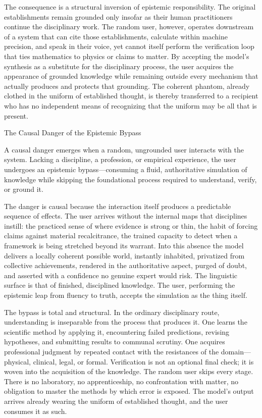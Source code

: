 The consequence is a structural inversion of epistemic responsibility. The original establishments remain grounded only insofar as their human practitioners continue the disciplinary work. The random user, however, operates downstream of a system that can cite those establishments, calculate within machine precision, and speak in their voice, yet cannot itself perform the verification loop that ties mathematics to physics or claims to matter. By accepting the model’s synthesis as a substitute for the disciplinary process, the user acquires the appearance of grounded knowledge while remaining outside every mechanism that actually produces and protects that grounding. The coherent phantom, already clothed in the uniform of established thought, is thereby transferred to a recipient who has no independent means of recognizing that the uniform may be all that is present.

The Causal Danger of the Epistemic Bypass

A causal danger emerges when a random, ungrounded user interacts with the system. Lacking a discipline, a profession, or empirical experience, the user undergoes an epistemic bypass—consuming a fluid, authoritative simulation of knowledge while skipping the foundational process required to understand, verify, or ground it.

The danger is causal because the interaction itself produces a predictable sequence of effects. The user arrives without the internal maps that disciplines instill: the practiced sense of where evidence is strong or thin, the habit of forcing claims against material recalcitrance, the trained capacity to detect when a framework is being stretched beyond its warrant. Into this absence the model delivers a locally coherent possible world, instantly inhabited, privatized from collective achievements, rendered in the authoritative aspect, purged of doubt, and asserted with a confidence no genuine expert would risk. The linguistic surface is that of finished, disciplined knowledge. The user, performing the epistemic leap from fluency to truth, accepts the simulation as the thing itself.

The bypass is total and structural. In the ordinary disciplinary route, understanding is inseparable from the process that produces it. One learns the scientific method by applying it, encountering failed predictions, revising hypotheses, and submitting results to communal scrutiny. One acquires professional judgment by repeated contact with the resistances of the domain—physical, clinical, legal, or formal. Verification is not an optional final check; it is woven into the acquisition of the knowledge. The random user skips every stage. There is no laboratory, no apprenticeship, no confrontation with matter, no obligation to master the methods by which error is exposed. The model’s output arrives already wearing the uniform of established thought, and the user consumes it as such.

